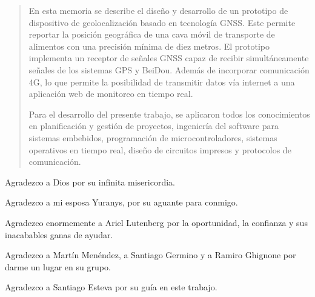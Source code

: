 \documentclass[
11pt, %
spanish,
singlespacing, %
parskip, %
headsepline, %
]{MastersDoctoralThesis} %
\author{Ing. Luis David Díaz Charris} %
\begin{document}
\frontmatter %

\pagestyle{plain} %



\begin{abstract}
\addchaptertocentry{\abstractname} %
%
\centering

En esta memoria se describe el diseño y desarrollo de un prototipo de dispositivo de geolocalización basado en tecnología GNSS. Este permite reportar la posición geográfica de una cava móvil de transporte de alimentos con una precisión mínima de diez metros. El prototipo implementa un receptor de señales GNSS capaz de recibir simultáneamente señales de los sistemas GPS y BeiDou. Además de incorporar comunicación 4G, lo que permite la posibilidad de transmitir datos vía internet a una aplicación web de monitoreo en tiempo real. 

Para el desarrollo del presente trabajo, se aplicaron todos los conocimientos en planificación y gestión de proyectos, ingeniería del software para sistemas embebidos, programación de microcontroladores, sistemas operativos en tiempo real, diseño de circuitos impresos y protocolos de comunicación. 

\end{abstract}


\begin{acknowledgements}
\vspace{1.5cm}

Agradezco a Dios por su infinita misericordia. 

Agradezco a mi esposa Yuranys, por su aguante para conmigo. 

Agradezco enormemente a Ariel Lutenberg por la oportunidad, la confianza y sus inacabables ganas de ayudar. 

Agradezco a Martín Menéndez, a Santiago Germino y a Ramiro Ghignone por darme un lugar en su grupo. 

Agradezco a Santiago Esteva por su guía en este trabajo. 

\end{acknowledgements}
\end{document}
